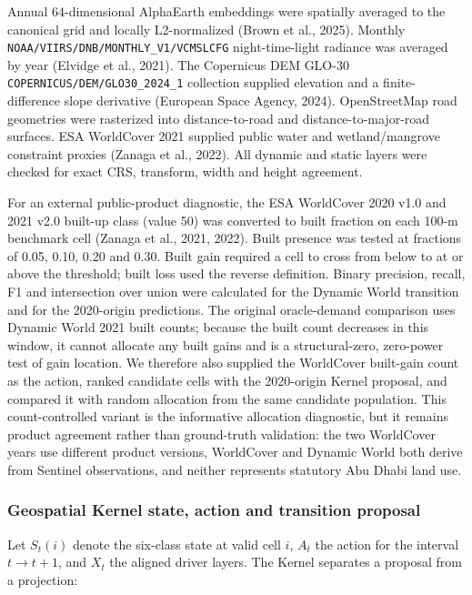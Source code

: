 \documentclass[
]{article}
\begin{document}
Annual 64-dimensional AlphaEarth embeddings were spatially averaged to
the canonical grid and locally L2-normalized (Brown et al., 2025).
Monthly \texttt{NOAA/VIIRS/DNB/MONTHLY\_V1/VCMSLCFG} night-time-light
radiance was averaged by year (Elvidge et al., 2021). The Copernicus DEM
GLO-30 \texttt{COPERNICUS/DEM/GLO30\_2024\_1} collection supplied
elevation and a finite-difference slope derivative (European Space
Agency, 2024). OpenStreetMap road geometries were rasterized into
distance-to-road and distance-to-major-road surfaces. ESA WorldCover
2021 supplied public water and wetland/mangrove constraint proxies
(Zanaga et al., 2022). All dynamic and static layers were checked for
exact CRS, transform, width and height agreement.

For an external public-product diagnostic, the ESA WorldCover 2020 v1.0
and 2021 v2.0 built-up class (value 50) was converted to built fraction
on each 100-m benchmark cell (Zanaga et al., 2021, 2022). Built presence
was tested at fractions of 0.05, 0.10, 0.20 and 0.30. Built gain
required a cell to cross from below to at or above the threshold; built
loss used the reverse definition. Binary precision, recall, F1 and
intersection over union were calculated for the Dynamic World transition
and for the 2020-origin predictions. The original oracle-demand
comparison uses Dynamic World 2021 built counts; because the built count
decreases in this window, it cannot allocate any built gains and is a
structural-zero, zero-power test of gain location. We therefore also
supplied the WorldCover built-gain count as the action, ranked candidate
cells with the 2020-origin Kernel proposal, and compared it with random
allocation from the same candidate population. This count-controlled
variant is the informative allocation diagnostic, but it remains product
agreement rather than ground-truth validation: the two WorldCover years
use different product versions, WorldCover and Dynamic World both derive
from Sentinel observations, and neither represents statutory Abu Dhabi
land use.

\subsubsection{Geospatial Kernel state, action and transition
proposal}\label{geospatial-kernel-state-action-and-transition-proposal}

Let \(S_t(i)\) denote the six-class state at valid cell \(i\), \(A_t\)
the action for the interval \(t\rightarrow t+1\), and \(X_t\) the
aligned driver layers. The Kernel separates a proposal from a
projection:
\end{document}
